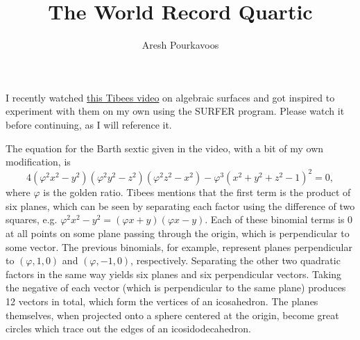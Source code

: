 \documentclass{article}
\begin{document}
\title{The World Record Quartic}
\author{Aresh Pourkavoos}
\maketitle

I recently watched \href{https://youtu.be/UVfR9u1TGW0}{this Tibees video} on algebraic surfaces
and got inspired to experiment with them on my own using the SURFER program.
Please watch it before continuing, as I will reference it.

The equation for the Barth sextic given in the video, with a bit of my own modification, is
$$4(\varphi^2x^2-y^2)(\varphi^2y^2-z^2)(\varphi^2z^2-x^2)-\varphi^3(x^2+y^2+z^2-1)^2=0,$$
where $\varphi$ is the golden ratio.
Tibees mentions that the first term is the product of six planes,
which can be seen by separating each factor using the difference of two squares,
e.g. $\varphi^2x^2-y^2 = (\varphi x+y)(\varphi x-y)$.
Each of these binomial terms is 0 at all points on some plane passing through the origin,
which is perpendicular to some vector.
The previous binomials, for example, represent planes
perpendicular to $(\varphi, 1, 0)$ and $(\varphi, -1, 0)$, respectively.
Separating the other two quadratic factors in the same way yields
six planes and six perpendicular vectors.
Taking the negative of each vector (which is perpendicular to the same plane)
produces 12 vectors in total, which form the vertices of an icosahedron.
The planes themselves, when projected onto a sphere centered at the origin,
become great circles which trace out the edges of an icosidodecahedron.
\end{document}
